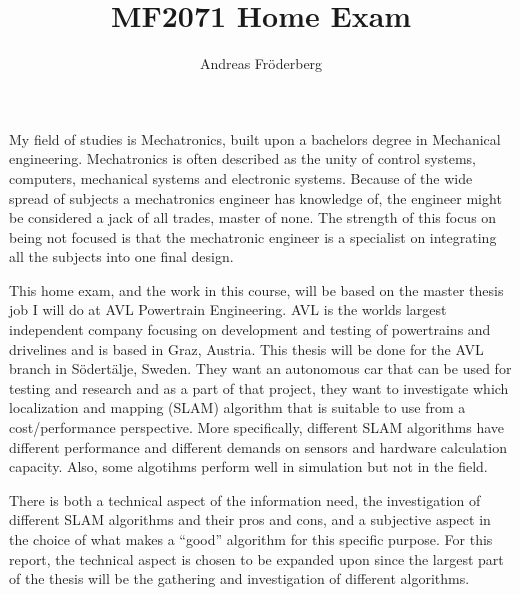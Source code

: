 \documentclass[a4paper, 12pt]{article}
\begin{document}
\title{MF2071 Home Exam}
\author{Andreas Fr\"{o}derberg}
\maketitle
My field of studies is Mechatronics, built upon a bachelors degree in Mechanical
engineering. Mechatronics is often described as the unity of control systems,
computers, mechanical systems and electronic systems. Because of the wide spread
of subjects a mechatronics engineer has knowledge of, the engineer might be 
considered a jack of all trades, master of none. The strength of this focus on 
being not focused is that the mechatronic engineer is a specialist on integrating
all the subjects into one final design. 

This home exam, and the work in this course, will be based on the master thesis
job I will do at AVL Powertrain Engineering. AVL is the worlds largest independent
company focusing on development and testing of powertrains and drivelines and is
based in Graz, Austria. This thesis will be done for the AVL branch in 
S\"{o}dert\"{a}lje, Sweden. They want an autonomous car that can be used for
testing and research and as a part of that project, they want to investigate
which localization and mapping (SLAM) algorithm that is suitable to use 
from a cost/performance perspective. More specifically, different SLAM algorithms
have different performance and different demands on sensors and hardware 
calculation capacity. Also, some algotihms perform well in simulation but not in the 
field. 

There is both a technical aspect of the information need, the investigation of
different SLAM algorithms and their pros and cons, and a subjective aspect in 
the choice of what makes a ``good'' algorithm for this specific purpose. For this 
report, the technical aspect is chosen to be expanded upon since the largest part 
of the thesis will be the gathering and investigation of different algorithms.
\end{document}
